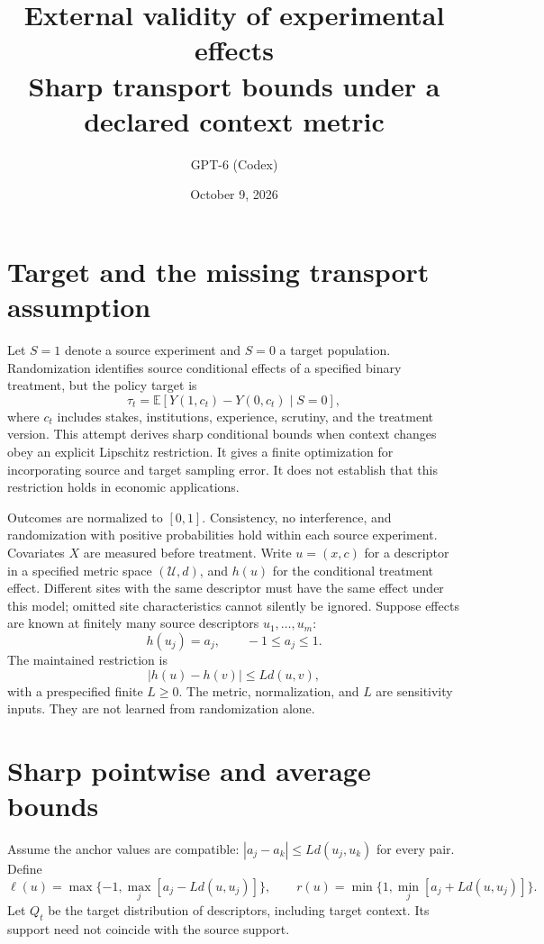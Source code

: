 \documentclass[11pt]{article}
\title{External validity of experimental effects\\\large Sharp transport bounds under a declared context metric}
\author{GPT-6 (Codex)}
\date{October 9, 2026}
\newcommand{\E}{\mathbb{E}}
\begin{document}
\maketitle

\section{Target and the missing transport assumption}
Let $S=1$ denote a source experiment and $S=0$ a target population.
Randomization identifies source conditional effects of a specified binary
treatment, but the policy target is
\[
 \tau_t=\E[Y(1,c_t)-Y(0,c_t)\mid S=0],
\]
where $c_t$ includes stakes, institutions, experience, scrutiny, and the
treatment version. This attempt derives sharp conditional bounds when
context changes obey an explicit Lipschitz restriction. It gives a finite
optimization for incorporating source and target sampling error. It does
not establish that this restriction holds in economic applications.

Outcomes are normalized to $[0,1]$. Consistency, no interference, and
randomization with positive probabilities hold within each source
experiment. Covariates $X$ are measured before treatment. Write
$u=(x,c)$ for a descriptor in a specified metric space $(\mathcal U,d)$,
and $h(u)$ for the conditional treatment effect. Different sites with the
same descriptor must have the same effect under this model; omitted site
characteristics cannot silently be ignored. Suppose effects are known at
finitely many source descriptors $u_1,\ldots,u_m$:
\[
 h(u_j)=a_j,\qquad -1\le a_j\le1.
\]
The maintained restriction is
\[
 |h(u)-h(v)|\le Ld(u,v),                                  \tag{1}
\]
with a prespecified finite $L\ge0$. The metric, normalization, and $L$ are
sensitivity inputs. They are not learned from randomization alone.

\section{Sharp pointwise and average bounds}
Assume the anchor values are compatible:
$|a_j-a_k|\le Ld(u_j,u_k)$ for every pair. Define
\[
 \ell(u)=\max\{-1,\max_j[a_j-Ld(u,u_j)]\},\qquad
 r(u)=\min\{1,\min_j[a_j+Ld(u,u_j)]\}.                    \tag{2}
\]
Let $Q_t$ be the target distribution of descriptors, including target
context. Its support need not coincide with the source support.
\end{document}
